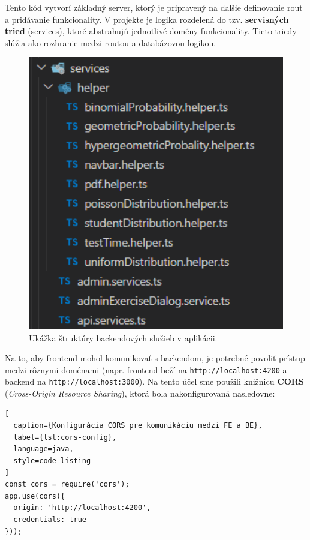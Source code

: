 Tento kód vytvorí základný server, ktorý je pripravený na ďalšie definovanie rout a pridávanie funkcionality.
 V projekte je logika rozdelená do tzv. \textbf{servisných tried} (services), ktoré abstrahujú jednotlivé domény funkcionality.
  Tieto triedy slúžia ako rozhranie medzi routou a databázovou logikou.
\begin{figure}[H]
  \centering
  \includegraphics[width=13cm]{img/backend-services.png}
  \caption{Ukážka štruktúry backendových služieb v aplikácii.}
  \label{fig:backend-services}
\end{figure}

\bigskip
Na to, aby frontend mohol komunikovať s backendom, je potrebné povoliť prístup medzi rôznymi doménami (napr. frontend beží na \texttt{http://localhost:4200} a backend na \texttt{http://localhost:3000}). Na tento účel sme použili knižnicu \textbf{CORS} (\textit{Cross-Origin Resource Sharing}), ktorá bola nakonfigurovaná nasledovne:

\begin{lstlisting}[
  caption={Konfigurácia CORS pre komunikáciu medzi FE a BE},
  label={lst:cors-config},
  language=java,
  style=code-listing
]
const cors = require('cors');
app.use(cors({
  origin: 'http://localhost:4200',
  credentials: true
}));
\end{lstlisting}

